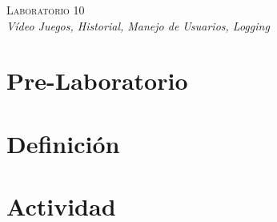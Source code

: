 \begin{center}
\textsc{\Large Laboratorio 10}~\\
\emph{\large Vídeo Juegos, Historial, Manejo de Usuarios, Logging}
\end{center}

\section{Pre-Laboratorio}

\section{Definición}


\section{Actividad}
